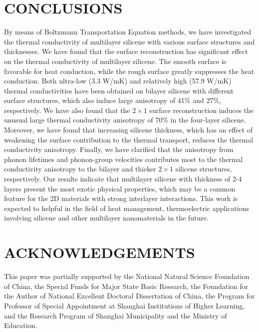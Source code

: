 \documentclass[review]{elsarticle}
\begin{document}
\section{CONCLUSIONS}
By means of Boltzmann Transportation Equation methods, we have investigated the thermal conductivity of multilayer silicene with various surface structures and thicknesses.
We have found that the surface reconstruction has significant effect on the thermal conductivity of multilayer silicene.  The smooth surface is favorable for heat conduction, while the rough surface greatly suppresses the heat conduction. Both ultra-low (3.3 W/mK) and relatively high (57.9 W/mK) thermal conductivities have been obtained on bilayer silicene with different surface structures, which also induce large anisotropy of 41\% and 27\%, respectively. We have also found that the $2 \times 1$ surface reconstruction induces the unusual large thermal conductivity anisotropy of 70\%  in the four-layer silicene.  Moreover, we have found that increasing silicene thickness, which has an effect of weakening the surface contribution to the thermal transport, reduces the thermal conductivity anisotropy. Finally, we have clarified that the anisotropy from phonon lifetimes and phonon-group velocities contributes most to the thermal conductivity anisotropy to the bilayer and thicker $2\times 1$ silicene structures, respectively. Our results indicate that multilayer silicene with thickness of 2-4 layers present the most exotic physical properties, which may be a common feature for the 2D materials with strong interlayer interactions.
This work is expected to helpful in the field of heat management, thermoelectric applications involving silicene and other multilayer nanomaterials in the future.


\section{ACKNOWLEDGEMENTS}
This paper was partially supported by the National Natural Science Foundation of China, the Special Funds for Major State Basic Research, the Foundation for the Author of National Excellent Doctoral Dissertation of China, the Program for Professor of Special Appointment at Shanghai Institutions of Higher Learning, and the Research Program of Shanghai Municipality and the Ministry of Education.



\end{document}
